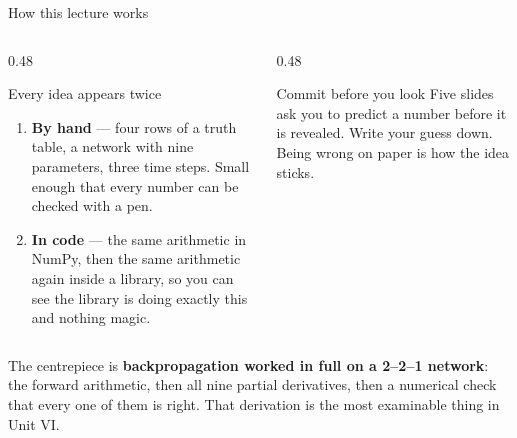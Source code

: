 \documentclass[aspectratio=169]{beamer}
\begin{document}
\begin{frame}[shrink=8]{How this lecture works}
  \begin{columns}[T]
    \begin{column}{0.48\textwidth}
      \begin{block}{Every idea appears twice}
        \begin{enumerate}
          \item \textbf{By hand} --- four rows of a truth table, a network
            with nine parameters, three time steps. Small enough that every
            number can be checked with a pen.
          \item \textbf{In code} --- the same arithmetic in NumPy, then the
            same arithmetic again inside a library, so you can see the
            library is doing exactly this and nothing magic.
        \end{enumerate}
      \end{block}
    \end{column}
    \begin{column}{0.48\textwidth}
      \begin{alertblock}{Commit before you look}
        Five slides ask you to predict a number before it is revealed. Write
        your guess down. Being wrong on paper is how the idea sticks.
      \end{alertblock}
    \end{column}
  \end{columns}
  \vspace{0.3em}
  \begin{center}
    \small The centrepiece is \textbf{backpropagation worked in full on a
    2--2--1 network}: the forward arithmetic, then all nine partial
    derivatives, then a numerical check that every one of them is right. That
    derivation is the most examinable thing in Unit VI.
  \end{center}
\end{frame}
\end{document}
